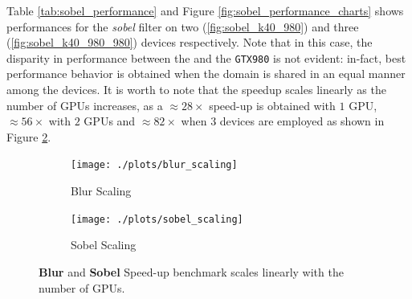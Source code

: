 Table \ref{tab:sobel_performance} and Figure \ref{fig:sobel_performance_charts} shows performances for the \textit{sobel} filter on two (\ref{fig:sobel_k40_980}) and three (\ref{fig:sobel_k40_980_980}) devices respectively.
Note that in this case, the disparity in performance between the  and the \texttt{GTX980} is not evident: in-fact, best performance behavior is obtained when the domain is shared in an equal manner among the devices.
It is worth to note that the speedup scales linearly as the number of GPUs increases, as a $\approx 28 \times$ speed-up is obtained with $1$ GPU, $\approx 56 \times$ with $2$ GPUs and  $\approx 82 \times$ when $3$ devices are employed as shown in Figure \ref{fig:sobel_scaling}.


\begin{figure}

    \begin{subfigure}{1.0\textwidth}
        \caption{Blur Scaling}
        \label{fig:blur_scaling}
    \texttt{[image: ./plots/blur\_scaling]}
    \end{subfigure}        
    \endminipage

    \begin{subfigure}{1.0\textwidth}
        \caption{Sobel Scaling}
        \label{fig:sobel_scaling}
        \texttt{[image: ./plots/sobel\_scaling]}
    \end{subfigure}
    \endminipage\hfill
    \caption[]{\textbf{Blur} and \textbf{Sobel} Speed-up benchmark scales linearly with the number of GPUs. }
    \label{fig:scaling}
\end{figure}


